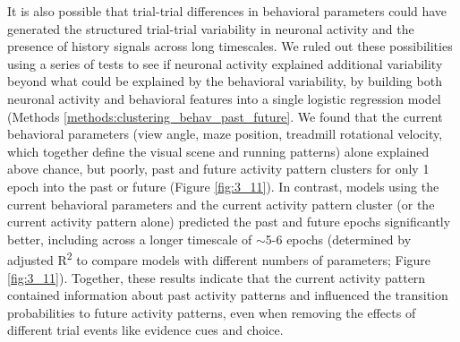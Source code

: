 \bigskip
It is also possible that trial-trial differences in behavioral parameters could have generated the structured trial-trial variability in neuronal activity and the presence of history signals across long timescales. We ruled out these possibilities using a series of tests to see if neuronal activity explained additional variability beyond what could be explained by the behavioral variability, by building both neuronal activity and behavioral features into a single logistic regression model (Methods \ref{methods:clustering_behav_past_future}. We found that the current behavioral parameters (view angle, maze position, treadmill rotational velocity, which together define the visual scene and running patterns) alone explained above chance, but poorly, past and future activity pattern clusters for only 1 epoch into the past or future (Figure \ref{fig:3_11}). In contrast, models using the current behavioral parameters and the current activity pattern cluster (or the current activity pattern alone) predicted the past and future epochs significantly better, including across a longer timescale of $\sim$5-6 epochs (determined by adjusted R\textsuperscript{2} to compare models with different numbers of parameters; Figure \ref{fig:3_11}). Together, these results indicate that the current activity pattern contained information about past activity patterns and influenced the transition probabilities to future activity patterns, even when removing the effects of different trial events like evidence cues and choice.


